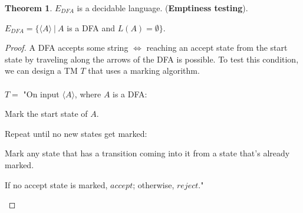\documentclass[11pt]{article}
\theoremstyle{definition}
\newtheorem{thm}{Theorem}[section]
\begin{document}
\begin{thm}
    $E_{DFA}$ is a decidable language. (\textbf{Emptiness testing}).
    \begin{center}
        $E_{DFA} = \{\langle A\rangle\ |\ A$ is a DFA and $L(A)=\emptyset\}$.
    \end{center}
\end{thm}
\begin{proof}
    A DFA accepts some string $\iff$ reaching an accept state from the start state by traveling along the arrows of the DFA is possible. To test this condition, we can design a TM $T$ that uses a marking algorithm.\\\\
$T =$ "On input $\langle A\rangle$, where $A$ is a DFA:
\begin{enumerate}
    \item Mark the start state of $A$.
    \item Repeat until no new states get marked:
{\setlength\itemindent{25pt}\item Mark any state that has a transition coming into it from a state that's already marked.}
    \item If no accept state is marked, $accept$; otherwise, $reject$."
\end{enumerate}
\end{proof}
\end{document}
